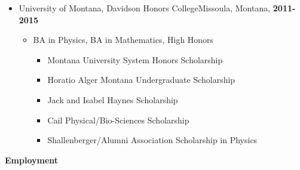 \documentclass{article}
\begin{document}
\begin{itemize}
\item[] {\large{University of Montana, Davidson Honors College}}\hfill Missoula, Montana, {\bf{2011-2015}}\\
\begin{itemize}
\item BA in Physics, BA in Mathematics, High Honors
\begin{itemize}
\item[] Montana University System Honors Scholarship
\item[] Horatio Alger Montana Undergraduate Scholarship 
\item[] Jack and Isabel Haynes Scholarship 
\item[] Cail Physical/Bio-Sciences Scholarship
\item[] Shallenberger/Alumni Association Scholarship in Physics 
\end{itemize}
\end{itemize}
\end{itemize}


{\large{\bf Employment}}
\end{document}
